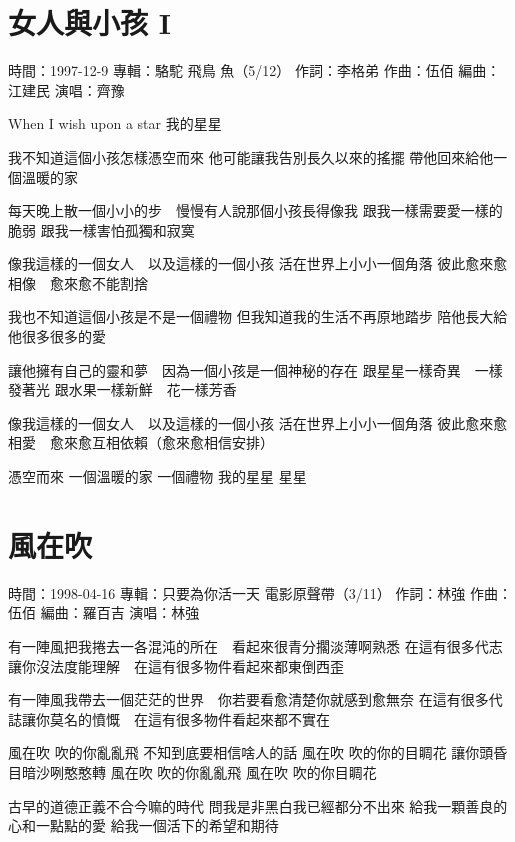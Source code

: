 \documentclass[UTF8,a4paper,oneside,twocolumn,12pt]{ctexbook}
\newcommand{\infopair}[2]{\textbullet #1：#2}
\newcommand{\zc}[1][伍佰]{\infopair{作詞}{#1}}
\newcommand{\zq}[1][伍佰]{\infopair{作曲}{#1}}
\newcommand{\bq}[1][伍佰]{\infopair{編曲}{#1}}
\newcommand{\zj}[1]{\infopair{專輯}{#1}}
\newcommand{\sj}[1]{\infopair{時間}{#1}}
\newenvironment{info}{\begin{flushleft}\kaishu
	}
	{\end{flushleft}\normalsize\yahei\par}
\newenvironment{lyric}{
	}
{}
\begin{document}
\section{女人與小孩 I}
\begin{info}
	\sj{1997-12-9}
	\zj{駱駝 飛鳥 魚（5/12）}
	\zc[李格弟]
	\zq
	\bq[江建民]
	\infopair{演唱}{齊豫}
\end{info}
\begin{lyric}
	When I wish upon a star
	我的星星

	我不知道這個小孩怎樣憑空而來
	他可能讓我告別長久以來的搖擺
	帶他回來給他一個溫暖的家

	每天晚上散一個小小的步　慢慢有人說那個小孩長得像我
	跟我一樣需要愛一樣的脆弱
	跟我一樣害怕孤獨和寂寞

	像我這樣的一個女人　以及這樣的一個小孩
	活在世界上小小一個角落
	彼此愈來愈相像　愈來愈不能割捨

	我也不知道這個小孩是不是一個禮物
	但我知道我的生活不再原地踏步
	陪他長大給他很多很多的愛

	讓他擁有自己的靈和夢　因為一個小孩是一個神秘的存在
	跟星星一樣奇異　一樣發著光
	跟水果一樣新鮮　花一樣芳香

	像我這樣的一個女人　以及這樣的一個小孩
	活在世界上小小一個角落
	彼此愈來愈相愛　愈來愈互相依賴（愈來愈相信安排）

	憑空而來
	一個溫暖的家
	一個禮物
	我的星星
	星星
\end{lyric}

\section{風在吹}
\begin{info}
	\sj{1998-04-16}
	\zj{只要為你活一天 電影原聲帶（3/11）}
	\zc[林強]
	\zq
	\bq[羅百吉]
	\infopair{演唱}{林強}
\end{info}
\begin{lyric}
	有一陣風把我捲去一各混沌的所在　看起來很青分擱淡薄啊熟悉
	在這有很多代志讓你沒法度能理解　在這有很多物件看起來都東倒西歪

	有一陣風我帶去一個茫茫的世界　你若要看愈清楚你就感到愈無奈
	在這有很多代誌讓你莫名的憤慨　在這有很多物件看起來都不實在


	風在吹 吹的你亂亂飛 不知到底要相信啥人的話
	風在吹 吹的你的目睭花 讓你頭昏目暗沙咧憨憨轉
	風在吹 吹的你亂亂飛
	風在吹 吹的你目睭花

	古早的道德正義不合今嘛的時代
	問我是非黑白我已經都分不出來
	給我一顆善良的心和一點點的愛
	給我一個活下的希望和期待
\end{lyric}
\end{document}
